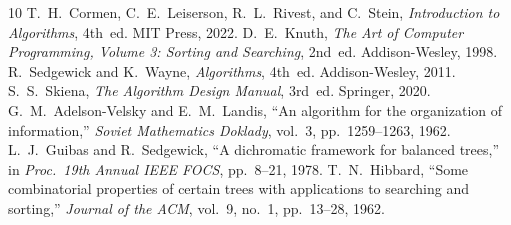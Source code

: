\documentclass[10pt,journal,compsoc,onecolumn]{IEEEtran}
\begin{document}
\begin{thebibliography}{10}
 T.~H.~Cormen, C.~E.~Leiserson, R.~L.~Rivest, and C.~Stein, \emph{Introduction to Algorithms}, 4th~ed. MIT Press, 2022.
 D.~E.~Knuth, \emph{The Art of Computer Programming, Volume 3: Sorting and Searching}, 2nd~ed. Addison-Wesley, 1998.
 R.~Sedgewick and K.~Wayne, \emph{Algorithms}, 4th~ed. Addison-Wesley, 2011.
 S.~S.~Skiena, \emph{The Algorithm Design Manual}, 3rd~ed. Springer, 2020.
 G.~M.~Adelson-Velsky and E.~M.~Landis, ``An algorithm for the organization of information,'' \emph{Soviet Mathematics Doklady}, vol.~3, pp.~1259--1263, 1962.
 L.~J.~Guibas and R.~Sedgewick, ``A dichromatic framework for balanced trees,'' in \emph{Proc.\ 19th Annual IEEE FOCS}, pp.~8--21, 1978.
 T.~N.~Hibbard, ``Some combinatorial properties of certain trees with applications to searching and sorting,'' \emph{Journal of the ACM}, vol.~9, no.~1, pp.~13--28, 1962.
\end{thebibliography}
\end{document}
